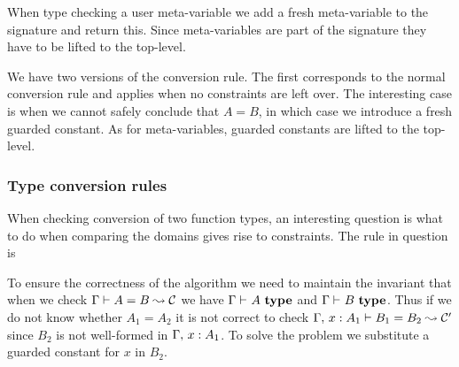 When type checking a user meta-variable we add a fresh meta-variable to the
signature and return this. Since meta-variables are part of the signature they
have to be lifted to the top-level.

We have two versions of the conversion rule. The first corresponds to the
normal conversion rule and applies when no constraints are left over. The
interesting case is when we cannot safely conclude that $A = B$, in which case
we introduce a fresh guarded constant. As for meta-variables, guarded constants
are lifted to the top-level.

\subsubsection{Type conversion rules}

When checking conversion of two function types, an interesting question is what
to do when comparing the domains gives rise to constraints. The rule in question is


To ensure the correctness of the algorithm we need to maintain the invariant
that when we check ${\Gamma} \vdash {A} = {B} \leadsto {\mathcal{C}}$ we have ${\Gamma} \vdash_{}A ~ \mathbf{type}$ and
${\Gamma} \vdash_{}B ~ \mathbf{type}$. Thus if we do not know whether $A_1 = A_2$ it is not
correct to check ${{\Gamma},\,{} x : A_1} \vdash {B_1} = {B_2} \leadsto {\mathcal{C}^\prime}$
since $B_2$ is not well-formed in ${\Gamma},\,{} x : A_1$. To solve the problem
we substitute a guarded constant for $x$ in $B_2$.

% 
% 
% 
% 
% 


